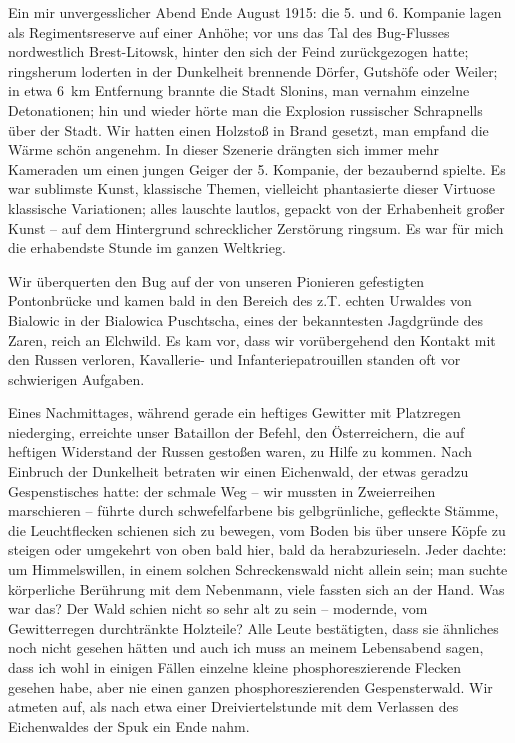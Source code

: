 \documentclass[a5paper,pagesize,10pt,twoside=true]{scrbook}
\begin{document}
Ein mir unvergesslicher Abend Ende August 1915: die 5. und 6. Kompanie lagen als Regimentsreserve auf einer Anhöhe; vor uns das Tal des Bug-Flusses nordwestlich Brest-Litowsk, hinter den sich der Feind zurückgezogen hatte; ringsherum loderten in der Dunkelheit brennende Dörfer, Gutshöfe oder Weiler; in etwa 6~km Entfernung brannte die Stadt Slonins, man vernahm einzelne Detonationen; hin und wieder hörte man die Explosion russischer Schrapnells über der Stadt. Wir hatten einen Holzstoß in Brand gesetzt, man empfand die Wärme schön angenehm. In dieser Szenerie drängten sich immer mehr Kameraden um einen jungen Geiger der 5. Kompanie, der bezaubernd spielte. Es war sublimste Kunst, klassische Themen, vielleicht phantasierte dieser Virtuose klassische Variationen; alles lauschte lautlos, gepackt von der Erhabenheit großer Kunst -- auf dem Hintergrund schrecklicher Zerstörung ringsum. Es war für mich die erhabendste Stunde im ganzen Weltkrieg.

Wir überquerten den Bug auf der von unseren Pionieren gefestigten Pontonbrücke und kamen bald in den Bereich des z.T. echten Urwaldes von Bialowic in der Bialowica Puschtscha, eines der bekanntesten Jagdgründe des Zaren, reich an Elchwild. Es kam vor, dass wir vorübergehend den Kontakt mit den Russen verloren, Kavallerie- und Infanteriepatrouillen standen oft vor schwierigen Aufgaben.

Eines Nachmittages, während gerade ein heftiges Gewitter mit Platzregen niederging, erreichte unser Bataillon der Befehl, den Österreichern, die auf heftigen Widerstand der Russen gestoßen waren, zu Hilfe zu kommen. Nach Einbruch der Dunkelheit betraten wir einen Eichenwald, der etwas geradzu Gespenstisches hatte: der schmale Weg -- wir mussten in Zweierreihen marschieren -- führte durch schwefelfarbene bis gelbgrünliche, gefleckte Stämme, die Leuchtflecken schienen sich zu bewegen, vom Boden bis über unsere Köpfe zu steigen oder umgekehrt von oben bald hier, bald da herabzurieseln. Jeder dachte: um Himmelswillen, in einem solchen Schreckenswald nicht allein sein; man suchte körperliche Berührung mit dem Nebenmann, viele fassten sich an der Hand. Was war das? Der Wald schien nicht so sehr alt zu sein -- modernde, vom Gewitterregen durchtränkte Holzteile? Alle Leute bestätigten, dass sie ähnliches noch nicht gesehen hätten und auch ich muss an meinem Lebensabend sagen, dass ich wohl in einigen Fällen einzelne kleine phosphoreszierende Flecken gesehen habe, aber nie einen ganzen phosphoreszierenden Gespensterwald. Wir atmeten auf, als nach etwa einer Dreiviertelstunde mit dem Verlassen des Eichenwaldes der Spuk ein Ende nahm.
\end{document}
